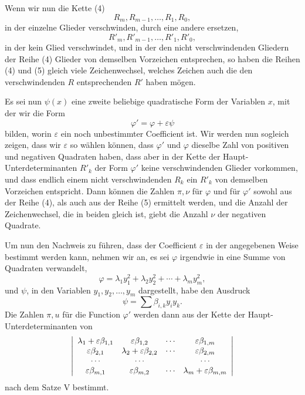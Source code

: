 \documentclass[11pt]{article}
\begin{document}
Wenn wir nun die Kette (4)
\[
        R_m,
        R_{m-1},
        \ldots,R_1,R_0,
\]
in der einzelne Glieder verschwinden, durch eine andere ersetzen,
\begin{equation}
        R'_m,
        R'_{m-1},
        \ldots,R'_1,R'_0,
\tag{5}
\end{equation}
in der kein Glied verschwindet, und in der den nicht verschwindenden Gliedern der Reihe (4) Glieder von demselben Vorzeichen entsprechen, so haben die Reihen (4) und (5) gleich viele Zeichenwechsel, welches Zeichen auch die den verschwindenden $R$ entsprechenden $R'$ haben m\"ogen.

Es sei nun $\psi(x)$ eine zweite beliebige quadratische Form der Variablen $x$, mit der wir die Form
\begin{equation}
        \varphi'=\varphi+\varepsilon\psi
\tag{6}
\end{equation}
bilden, worin $\varepsilon$ ein noch unbestimmter Coefficient ist. Wir werden nun sogleich zeigen, dass wir $\varepsilon$ so w\"ahlen k\"onnen, dass $\varphi'$ und $\varphi$ dieselbe Zahl von positiven und negativen Quadraten haben, dass aber in der Kette der Haupt-Unterdeterminanten $R'_k$ der Form $\varphi'$ keine verschwindenden Glieder vorkommen, und dass endlich einem nicht verschwindenden $R_k$ ein $R'_k$ von demselben Vorzeichen entspricht. Dann k\"onnen die Zahlen $\pi,\nu$ f\"ur $\varphi$ und f\"ur $\varphi'$ sowohl aus der Reihe (4), als auch aus der Reihe (5) ermittelt werden, und die Anzahl der Zeichenwechsel, die in beiden gleich ist, giebt die Anzahl $\nu$ der negativen Quadrate.

Um nun den Nachweis zu f\"uhren, dass der Coefficient $\varepsilon$ in der angegebenen Weise bestimmt werden kann, nehmen wir an, es sei $\varphi$ irgendwie in eine Summe von Quadraten verwandelt,
\[
        \varphi=\lambda_1y_1^2+\lambda_2y_2^2+\cdots+\lambda_my_m^2,
\]
und $\psi$, in den Variablen $y_1,y_2,
\ldots,y_m$ dargestellt, habe den Ausdruck
\[
        \psi=\sum \beta_{i,k}y_i y_k.
\]
Die Zahlen $\pi,
u$ f\"ur die Function $\varphi'$ werden dann aus der Kette der Haupt-Unterdeterminanten von
\[
\left|\begin{array}{cccc}
 \lambda_1+\varepsilon\beta_{1,1}&\varepsilon\beta_{1,2}&\cdots&\varepsilon\beta_{1,m}\cr
 \varepsilon\beta_{2,1}&\lambda_2+\varepsilon\beta_{2,2}&\cdots&\varepsilon\beta_{2,m}\cr
 \cdots&\cdots&&\cdots\cr
 \varepsilon\beta_{m,1}&\varepsilon\beta_{m,2}&\cdots&\lambda_m+\varepsilon\beta_{m,m}
\end{array}\right|
\]
nach dem Satze V bestimmt.
\end{document}
